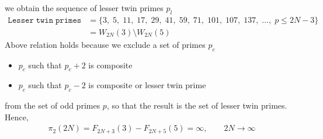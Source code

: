 we obtain the sequence of lesser twin primes $p_l$
\begin{align*}
    \mathtt{Lesser \; twin \; primes} &= \{ 3, \; 5, \; 11, \; 17, \; 29, \; 41, \; 59, \; 71, \; 101, \; 107, \; 137, \; \dots, \;  p \leq 2N - 3 \} \\
    &= W_{2N}(3) \setminus W_{2N}(5)
\end{align*}
Above relation holds because we exclude a set of primes $p_c$
\begin{itemize}
    \item $p_c$ such that $p_c+2$ is composite
    \item $p_c$ such that $p_c-2$ is composite or lesser twin prime
\end{itemize}
from the set of odd primes $p$, so that the result is the set of lesser twin primes.
Hence,
\begin{align*}
    \pi_2 (2N) = F_{2N+3}(3) - F_{2N+5}(5) = \infty, \quad \quad 2N \to \infty
\end{align*}
